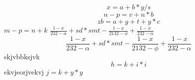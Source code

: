$$x=a+b*y/s$$
$$n-p=v+n*b$$
\begin{equation}
zb=a+g+t+y*c\end{equation}
\(m-p=n+k\)
$\frac{1 - x}{232 - \alpha} + sd*smt -\frac{1 - x}{2132 - \phi} + \frac{1 - x}{232 - \alpha}$
\begin{equation}
\frac{1 - x}{232 - \alpha} + sd*smt -\frac{1 - x}{2132 - \phi} + \frac{1 - x}{232 - \alpha}
\end{equation}
skjvbbksjvk $$h=k+i*i$$ ekvjeorjvekvj
$j=k+y*y$
